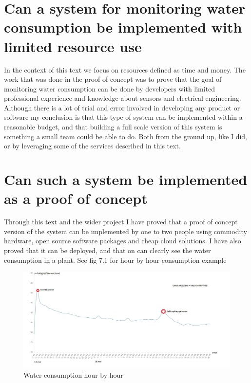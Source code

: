 \documentclass[]{uiophd}
\begin{document}
\section{ Can a system for monitoring water consumption be implemented with limited resource use}

In the context of this text we focus on resources defined as time and money. The work that was done in the proof of concept was to prove that the goal of monitoring water consumption can be done by developers with limited professional experience and knowledge about sensors and electrical engineering. Although there is a lot of trial and error involved in developing any product or software my conclusion is that this type of system can be implemented within a reasonable budget, and that building a full scale version of this system is something a small team could be able to do. Both from the ground up, like I did, or by leveraging some of the services described in this text.

\section{ Can such a system be implemented as a proof of concept}

Through this text and the wider project I have proved that a proof of concept version of the system can be implemented by one to two people using commodity hardware, open source software packages and cheap cloud solutions. I have also proved that it can be deployed, and that on can clearly see the water consumption in a plant. See fig 7.1 for hour by hour consumption example
 \begin{figure}[h]
\caption{Water consumption hour by hour}
\centering
\includegraphics[width=14cm]{warter_hourbyhour.png}
\end{figure}
\end{document}
